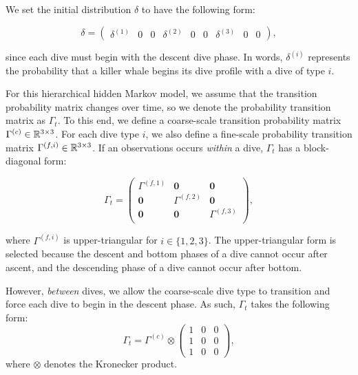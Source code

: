 We set the initial distribution $\delta$ to have the following form:

\begin{equation}
    \delta = \begin{pmatrix} \delta^{(1)} & 0 & 0 & \delta^{(2)} & 0 & 0 & \delta^{(3)} & 0 & 0 \end{pmatrix},
    \label{eqn:delta_case_study}
\end{equation}

since each dive must begin with the descent dive phase. In words, $\delta^{(i)}$ represents the probability that a killer whale begins its dive profile with a dive of type $i$. 

For this hierarchical hidden Markov model, we assume that the transition probability matrix changes over time, so we denote the probability transition matrix as $\Gamma_t$. To this end, we define a coarse-scale transition probability matrix $\Gamma^{(c)} \in \mathbb{R}^{3 \times 3}$. For each dive type $i$, we also define a fine-scale probability transition matrix $\Gamma^{(f,i)} \in \mathbb{R}^{3 \times 3}$. If an observations occurs \textit{within} a dive, $\Gamma_t$ has a block-diagonal form:

\begin{equation}
    \Gamma_t = 
    \begin{pmatrix}
        \Gamma^{(f,1)} & \mathbf{0} & \mathbf{0} \\
        \mathbf{0} & \Gamma^{(f,2)} & \mathbf{0} \\
        \mathbf{0} & \mathbf{0} & \Gamma^{(f,3)} \\
    \end{pmatrix},
\end{equation}

where $\Gamma^{(f,i)}$ is upper-triangular for $i \in \{1,2,3\}$. The upper-triangular form is selected because the descent and bottom phases of a dive cannot occur after ascent, and the descending phase of a dive cannot occur after bottom.

However, \textit{between} dives, we allow the coarse-scale dive type to transition and force each dive to begin in the descent phase. As such, $\Gamma_t$ takes the following form:
%
\begin{equation}
    \Gamma_t = \Gamma^{(c)} \otimes \begin{pmatrix} 1 & 0 & 0 \\ 1 & 0 & 0 \\ 1 & 0 & 0 \end{pmatrix},
\end{equation}
%
where $\otimes$ denotes the Kronecker product.

